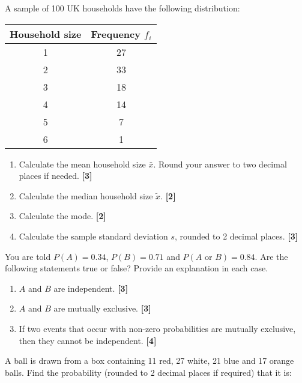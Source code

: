\documentclass[a4paper, leqno, 12pt]{article} %
\newenvironment{top_enumerate}{
\begin{enumerate}
  \setlength{\itemsep}{2em}
  \setlength{\topsep}{-0pt}
  \setlength{\partopsep}{-0pt}
}{\end{enumerate}}
\begin{document}
\begin{top_enumerate}

\item A sample of 100 UK households have the following distribution:

\begin{center}
\begin{tabular}{cc}
Household size & Frequency $f_i$ \\
\hline
1 & {27} \\
2 & {33} \\
3 & {18} \\
4 & {14} \\
5 & {7} \\
6 & {1} \\
\hline
\end{tabular}
\end{center}
 
\setcounter{equation}{0}  %
\begin{enumerate}
	\setlength{\topsep}{-0pt}
	\setlength{\partopsep}{-0pt}
	\setlength{\itemsep}{10pt}
			\item Calculate the mean household size $\bar x$. Round your answer to two decimal places if needed.
	 \quad \textbf{[3]}
		\item Calculate the median household size $\tilde x$.
	 \quad \textbf{[2]}
		\item Calculate the mode.
	 \quad \textbf{[2]}
		\item Calculate the sample standard deviation $s$, rounded to 2 decimal places.
	 \quad \textbf{[3]}
\end{enumerate}\item You are told $P(A) = {0.34}$, $P(B) = {0.71}$ and $P(A \textrm{ or } B) = {0.84}$. Are the following statements true or false? Provide an explanation in each case.
 
\setcounter{equation}{0}  %
\begin{enumerate}
	\setlength{\topsep}{-0pt}
	\setlength{\partopsep}{-0pt}
	\setlength{\itemsep}{10pt}
			\item $A$ and $B$ are independent.
	 \quad \textbf{[3]}
		\item $A$ and $B$ are mutually exclusive.
	 \quad \textbf{[3]}
		\item If two events that occur with non-zero probabilities are mutually exclusive, then they cannot be independent.
	 \quad \textbf{[4]}
\end{enumerate}\item A ball is drawn from a box containing {11} red, {27} white, {21} blue and {17} orange balls. Find the probability (rounded to 2 decimal places if required) that it is:
 

\end{top_enumerate}
\end{document}
